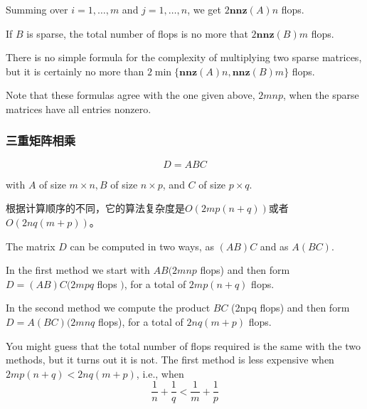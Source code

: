 Summing over $ i=1, \ldots, m $ and $ j=1, \ldots, n $, we get $ 2 \mathbf{n n z}(A) n $ flops. 

If $ B $ is sparse, the total number of flops is no more that $ 2 \mathbf{n n z}(B) m $ flops. 

There is no simple formula for the complexity of multiplying two sparse matrices, but it is certainly no more than $ 2 \min \{\mathbf{n n z}(A) n, \mathbf{n n z}(B) m\} $ flops.

\begin{remark}
    Note that these formulas agree with the one given above, $ 2 m n p $, when the sparse matrices have all entries nonzero.
\end{remark}

\subsubsection{三重矩阵相乘}

\begin{theorem}
    $$ D=A B C $$

with $ A $ of size $ m \times n, B $ of size $ n \times p $, and $ C $ of size $ p \times q $. 

    根据计算顺序的不同，它的算法复杂度是$O( 2 m p(n+q) )$或者$O(2 n q(m+p) )$。
\end{theorem}



The matrix $ D $ can be computed in two ways, as $ (A B) C $ and as $ A(B C) $. 

In the first method we start with $ A B(2 m n p $ flops) and then form $ D=(A B) C(2 m p q $ flops $ ) $, for a total of $ 2 m p(n+q) $ flops. 

In the second method we compute the product $ B C $ (2npq flops) and then form $ D=A(B C)(2 m n q $ flops), for a total of $ 2 n q(m+p) $ flops.

\begin{remark}
    You might guess that the total number of flops required is the same with the two methods, but it turns out it is not. The first method is less expensive when $ 2 m p(n+q)<2 n q(m+p) $, i.e., when
$$
\frac{1}{n}+\frac{1}{q}<\frac{1}{m}+\frac{1}{p}
$$
\end{remark}

